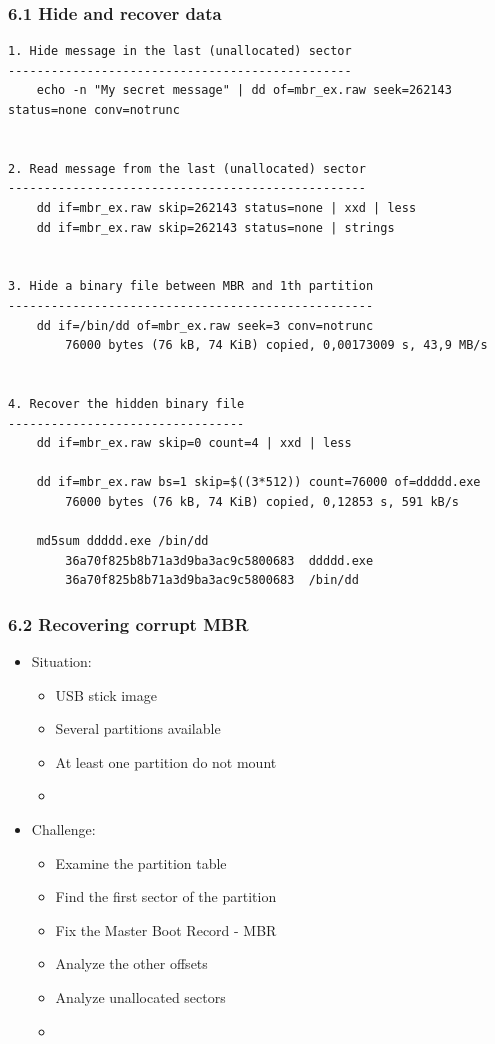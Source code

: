 \begin{frame}[fragile]
  \frametitle{6.1 Hide and recover data}
  \begin{lstlisting}[basicstyle=\tiny]
1. Hide message in the last (unallocated) sector
------------------------------------------------
    echo -n "My secret message" | dd of=mbr_ex.raw seek=262143 status=none conv=notrunc


2. Read message from the last (unallocated) sector
--------------------------------------------------
    dd if=mbr_ex.raw skip=262143 status=none | xxd | less
    dd if=mbr_ex.raw skip=262143 status=none | strings


3. Hide a binary file between MBR and 1th partition
---------------------------------------------------
    dd if=/bin/dd of=mbr_ex.raw seek=3 conv=notrunc
        76000 bytes (76 kB, 74 KiB) copied, 0,00173009 s, 43,9 MB/s


4. Recover the hidden binary file
---------------------------------
    dd if=mbr_ex.raw skip=0 count=4 | xxd | less

    dd if=mbr_ex.raw bs=1 skip=$((3*512)) count=76000 of=ddddd.exe
        76000 bytes (76 kB, 74 KiB) copied, 0,12853 s, 591 kB/s

    md5sum ddddd.exe /bin/dd 
        36a70f825b8b71a3d9ba3ac9c5800683  ddddd.exe
        36a70f825b8b71a3d9ba3ac9c5800683  /bin/dd
  \end{lstlisting}
\end{frame}


\begin{frame}[fragile]
  \frametitle{6.2 Recovering corrupt MBR}
  \begin{itemize}
    \item Situation:
    \begin{itemize}
      \item USB stick image
      \item Several partitions available
      \item At least one partition do not mount
      \item[]
    \end{itemize}
    \item Challenge:
    \begin{itemize}
      \item Examine the partition table
      \item Find the first sector of the partition
      \item Fix the Master Boot Record - MBR
      \item Analyze the other offsets
      \item Analyze unallocated sectors
      \item[]
    \end{itemize}
  \end{itemize}
\end{frame}


